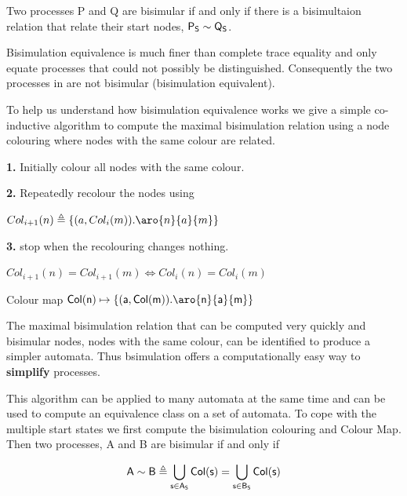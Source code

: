 \documentclass[]{article}
\begin{document}
 Two processes {\sf P} and {\sf Q} are bisimular if and only if there is a bisimultaion relation that relate their start nodes, ${\sf P_S\sim Q_S}$.

 Bisimulation equivalence is much finer than complete trace equality and  only equate processes that could not possibly be distinguished.
 Consequently the two processes in  are not bisimular (bisimulation equivalent).

 To help us understand how bisimulation equivalence works we give a simple co-inductive algorithm to compute the maximal  bisimulation relation  using a node colouring where  nodes with the same colour  are related.

\begin{center}\begin{minipage}{0.7\textwidth}

 {\bf 1.} Initially colour all nodes with the same colour.

{\bf 2.} Repeatedly recolour the nodes using
     \begin{center}
     $Col_{i+1}(n) \triangleq \{(a,Col_i(m)) .\aro{n}{a}{m}\}$
     
     \end{center}

{\bf 3.} \hspace{0.25in} stop when  the recolouring changes nothing.
\begin{center}
     $Col_{i+1}(n) =Col_{i+1}(m) \Leftrightarrow Col_{i}(n) =Col_{i}(m)$
 
      {\sf Colour map} $\sf Col(n) \mapsto \{(a,Col(m)) .\aro{n}{a}{m}\}$
     \end{center}

\end{minipage} \end{center}

 The maximal bisimulation relation that  can be computed very quickly and  bisimular nodes, nodes with the same colour, can be identified to produce a simpler automata. 
 Thus bsimulation offers a  computationally easy way to {\bf simplify} processes.

 This algorithm can be applied to many automata at the same time and can be used to compute an equivalence   class on a set of   automata.
 To cope with the multiple start states we first compute the bisimulation colouring and {\sf Colour Map}. Then two processes, {\sf A} and {\sf B}  are bisimular if and only if 
 
 \[ \sf  A\sim B \triangleq \bigcup_{s\in A_S} Col(s)  = \bigcup_{s\in B_S} Col(s) \]
 
\end{document}
